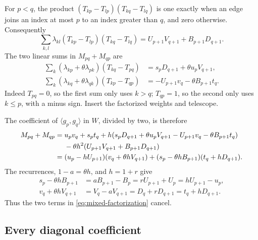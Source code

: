 \documentclass[11pt]{article}
\numberwithin{equation}{section}
\theoremstyle{remark}
\newcommand{\ip}[2]{\langle #1,#2\rangle}
\begin{document}
For $p<q$, the product
$(T_{kp}-T_{lp})(T_{kq}-T_{lq})$ is one exactly when an edge joins an
index at most $p$ to an index greater than $q$, and zero otherwise.
Consequently
\begin{equation}
\sum_{k,l}\lambda_{kl}(T_{kp}-T_{lp})(T_{kq}-T_{lq})
=U_{p+1}V_{q+1}+B_{p+1}D_{q+1}.
\label{eq:double-cut}
\end{equation}
The two linear sums in $M_{pq}+M_{qp}$ are
\begin{align*}
\sum_k(\lambda_{kp}+\theta\lambda_{pk})(T_{kq}-T_{pq})
 &=s_pD_{q+1}+\theta u_pV_{q+1},\\
\sum_k(\lambda_{kq}+\theta\lambda_{qk})(T_{kp}-T_{qp})
 &=-U_{p+1}v_q-\theta B_{p+1}t_q.
\end{align*}
Indeed $T_{pq}=0$, so the first sum only uses $k>q$; $T_{qp}=1$,
so the second only uses $k\leq p$, with a minus sign. Insert the
factorized weights and telescope.

The coefficient of $\ip{g_p}{g_q}$ in $W$, divided by two, is therefore
\begin{align}
M_{pq}+M_{qp}
={}&u_pv_q+s_pt_q
+h(s_pD_{q+1}+\theta u_pV_{q+1}
       -U_{p+1}v_q-\theta B_{p+1}t_q)\notag\\
&-\theta h^2(U_{p+1}V_{q+1}+B_{p+1}D_{q+1})\notag\\
={}&(u_p-hU_{p+1})(v_q+\theta hV_{q+1})
 +(s_p-\theta hB_{p+1})(t_q+hD_{q+1}).
\label{eq:mixed-factorization}
\end{align}
The recurrences, $1-a=\theta h$, and $h=1+r$ give
\begin{align*}
s_p-\theta hB_{p+1}
&=aB_{p+1}-B_p=rU_{p+1}+U_p=hU_{p+1}-u_p,\\
v_q+\theta hV_{q+1}
&=V_q-aV_{q+1}=D_q+rD_{q+1}=t_q+hD_{q+1}.
\end{align*}
Thus the two terms in \eqref{eq:mixed-factorization} cancel.

\subsection{Every diagonal coefficient}
\end{document}
